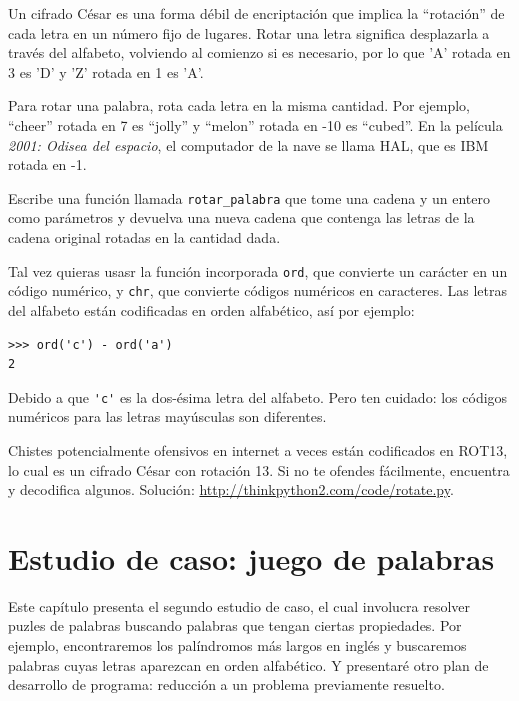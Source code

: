 \documentclass[10pt]{book}
\begin{document}
\begin{exercise}

\label{exrotate}
Un cifrado César es una forma débil de encriptación que implica la ``rotación'' de cada
letra en un número fijo de lugares.  Rotar una letra significa
desplazarla a través del alfabeto, volviendo al comienzo si
es necesario, por lo que 'A' rotada en 3 es 'D' y 'Z' rotada en 1 es 'A'.

Para rotar una palabra, rota cada letra en la misma cantidad.
Por ejemplo, ``cheer'' rotada en 7 es ``jolly'' y ``melon'' rotada
en -10 es ``cubed''.  En la película {\em 2001: Odisea del espacio}, el
computador de la nave se llama HAL, que es IBM rotada en -1.


Escribe una función llamada \verb"rotar_palabra"
que tome una cadena y un entero como parámetros y devuelva
una nueva cadena que contenga las letras de la cadena original
rotadas en la cantidad dada.

Tal vez quieras usasr la función incorporada {\tt ord}, que convierte
un carácter en un código numérico, y {\tt chr}, que convierte códigos
numéricos en caracteres.  Las letras del alfabeto están codificadas en orden alfabético,
así por ejemplo:

\begin{verbatim}
>>> ord('c') - ord('a')
2
\end{verbatim}

Debido a que \verb"'c'" es la dos-ésima letra del alfabeto.  Pero ten
cuidado: los códigos numéricos para las letras mayúsculas son diferentes.

Chistes potencialmente ofensivos en internet a veces están codificados en
ROT13, lo cual es un cifrado César con rotación 13.  Si no te
ofendes fácilmente, encuentra y decodifica algunos.  Solución:
\url{http://thinkpython2.com/code/rotate.py}.

\end{exercise}


\chapter{Estudio de caso: juego de palabras}
\label{wordplay}

Este capítulo presenta el segundo estudio de caso, el cual involucra
resolver puzles de palabras buscando palabras que tengan ciertas
propiedades.  Por ejemplo, encontraremos los palíndromos más largos
en inglés y buscaremos palabras cuyas letras aparezcan en
orden alfabético.  Y presentaré otro plan de desarrollo de
programa: reducción a un problema previamente resuelto.
\end{document}
